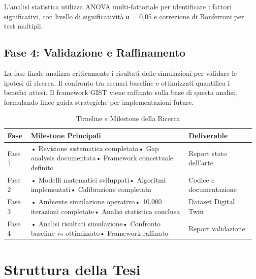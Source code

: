 L'analisi statistica utilizza ANOVA multi-fattoriale per identificare i fattori significativi, con livello di significatività α = 0,05 e correzione di Bonferroni per test multipli.

\subsection{\texorpdfstring{\textbf{Fase 4: Validazione e Raffinamento}}{1.5.5 - Fase 4: Validazione e Raffinamento}}
\label{subsec:fase4}

La fase finale analizza criticamente i risultati delle simulazioni per validare le ipotesi di ricerca. Il confronto tra scenari baseline e ottimizzati quantifica i benefici attesi. Il framework GIST viene raffinato sulla base di questa analisi, formulando linee guida strategiche per implementazioni future.

\begin{table}[htbp]
\centering
\small
\caption{Timeline e Milestone della Ricerca}
\label{tab:timeline_ricerca}
\begin{tabularx}{\textwidth}{@{}lXl@{}}
\toprule
\textbf{Fase} & \textbf{Milestone Principali} & \textbf{Deliverable} \\
\midrule
Fase 1 & • Revisione sistematica completata\newline• Gap analysis documentata\newline• Framework concettuale definito & Report stato dell'arte \\
Fase 2 & • Modelli matematici sviluppati\newline• Algoritmi implementati\newline• Calibrazione completata & Codice e documentazione \\
Fase 3 & • Ambiente simulazione operativo\newline• 10.000 iterazioni completate\newline• Analisi statistica conclusa & Dataset Digital Twin \\
Fase 4 & • Analisi risultati simulazione\newline• Confronto baseline vs ottimizzato\newline• Framework raffinato & Report validazione \\
\bottomrule
\end{tabularx}
\end{table}

\section{\texorpdfstring{\textbf{Struttura della Tesi}}{1.6 - Struttura della Tesi}}
\label{sec:struttura_tesi}

